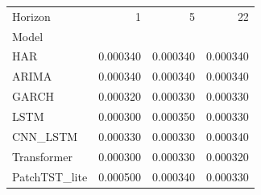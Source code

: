\begin{tabular}{lrrr}
\toprule
Horizon & 1 & 5 & 22 \\
Model &  &  &  \\
\midrule
HAR & 0.000340 & 0.000340 & 0.000340 \\
ARIMA & 0.000340 & 0.000340 & 0.000340 \\
GARCH & 0.000320 & 0.000330 & 0.000330 \\
LSTM & 0.000300 & 0.000350 & 0.000330 \\
CNN_LSTM & 0.000330 & 0.000330 & 0.000340 \\
Transformer & 0.000300 & 0.000330 & 0.000320 \\
PatchTST_lite & 0.000500 & 0.000340 & 0.000330 \\
\bottomrule
\end{tabular}
